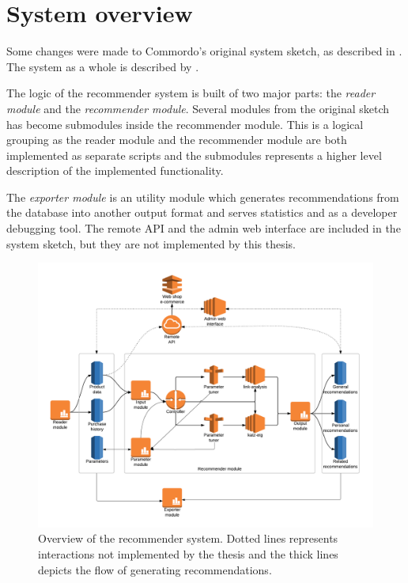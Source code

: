 
\section{System overview}\label{sec:res:sys}

Some changes were made to Commordo's original system sketch, as described in . The system as a whole is described by .

The logic of the recommender system is built of two major parts: the \textit{reader module} and the \textit{recommender module}. Several modules from the original sketch has become submodules inside the recommender module. This is a logical grouping as the reader module and the recommender module are both implemented as separate scripts and the submodules represents a higher level description of the implemented functionality. 

The \textit{exporter module} is an utility module which generates recommendations from the database into another output format and serves statistics and as a developer debugging tool.  The remote API and the admin web interface are included in the system sketch, but they are not implemented by this thesis.

\begin{figure}[h!]
  \centering
    \includegraphics[width=1.0\textwidth]{fig/system_overview_final.png}
  \caption{Overview of the recommender system. Dotted lines represents interactions not implemented by the thesis and the thick lines depicts the flow of generating recommendations.}
  \label{fig:sysfinal}
\end{figure}

\FloatBarrier





